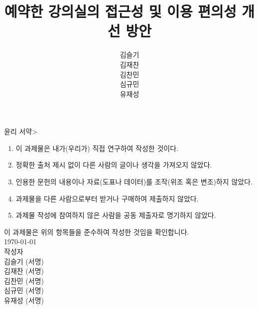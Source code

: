 \documentclass[11pt,a4paper]{article}
\begin{document}
\title{예약한 강의실의 접근성 및 이용 편의성 개선 방안}
\author{
김슬기\\
김재찬\\
김찬민\\
심규민\\
유재성
}
\date{}
\maketitle

\begin{framed}

\centerline{ 윤리 서약\textgreater}

\begin{enumerate}
\item 이 과제물은 내가(우리가) 직접 연구하여 작성한 것이다.
\item 정확한 출처 제시 없이 다른 사람의 글이나 생각을 가져오지 않았다.
\item 인용한 문헌의 내용이나 자료(도표나 데이터)를 조작(위조 혹은 변조)하지 않았다.
\item 과제물을 다른 사람으로부터 받거나 구매하여 제출하지 않았다.
\item 과제물 작성에 참여하지 않은 사람을 공동 제출자로 명기하지 않았다.
\end{enumerate}

\begin{center}
이 과제물은 위의 항목들을 준수하여 작성한 것임을 확인합니다.\\
\hfill\break
\koreandate\today\\
\hfill\break
작성자\\
\hfill\break
김슬기 (서명)\\
김재찬 (서명)\\
김찬민 (서명)\\
심규민 (서명)\\
유재성 (서명)
\end{center}

\end{framed}
\end{document}
